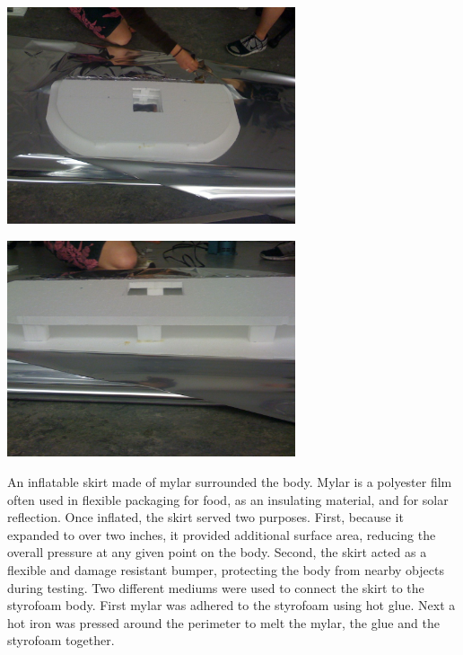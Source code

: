 \begin{minipage}{6.5in}
  \begin{center}
    \includegraphics[width=85mm]{imageSources/rigidity1.png}
  \end{center}
  \label{rigidity1}
\end{minipage}

\begin{minipage}{6.5in}
  \begin{center}
    \includegraphics[width=85mm]{imageSources/rigidity2.png}
  \end{center}
  \label{rigidity2}
\end{minipage}

An inflatable skirt made of mylar surrounded the body. Mylar is a polyester film often used in flexible packaging for food, as an insulating material, and for solar reflection. Once inflated, the skirt served two purposes. First, because it expanded to over two inches, it provided additional surface area, reducing the overall pressure at any given point on the body. Second, the skirt acted as a flexible and damage resistant bumper, protecting the body from nearby objects during testing. Two different mediums were used to connect the skirt to the styrofoam body. First mylar was adhered to the styrofoam using hot glue.  Next a hot iron was pressed around the perimeter to melt the mylar, the glue and the styrofoam together.

